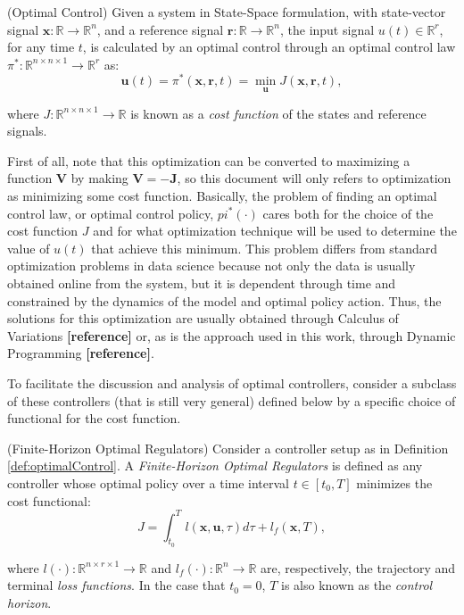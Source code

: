 \documentclass[a4paper,11pt]{book}
\numberwithin{figure}{chapter}
\numberwithin{equation}{chapter}
\numberwithin{table}{chapter}
\theoremstyle{definition}
\newtheorem{definition}{Definition}[chapter]
\newcounter{boxed-theorem}
\newcounter{boxed-definition}
\newenvironment{boxed-definition}[1]
{\begin{shaded} \begin{definition}{#1}}
{\end{definition} \end{shaded}}
\begin{document}
\begin{boxed-definition}{(Optimal Control)} \label{def:optimalControl}
Given a system in State-Space formulation, with state-vector signal $\bm{x} : \mathbb{R} \rightarrow \mathbb{R}^{n}$, and a reference signal $\bm{r} : \mathbb{R} \rightarrow \mathbb{R}^{n}$, the input signal $u(t) \in \mathbb{R}^r$, for any time $t$, is calculated by an optimal control through an optimal control law $\pi^* : \mathbb{R}^{n \times n \times 1} \rightarrow \mathbb{R}^r$ as:
    \begin{equation}
        \bm{u}(t) = \pi^*(\bm{x}, \bm{r}, t) = \min_{\bm{u}} J(\bm{x}, \bm{r}, t)
    ,\end{equation}
    
\noindent where $J : \mathbb{R}^{n \times n \times 1} \rightarrow \mathbb{R}$ is known as a \textit{cost function} of the states and reference signals.
\end{boxed-definition}

First of all, note that this optimization can be converted to maximizing a function $\bm{V}$ by making $\bm{V} = -\bm{J}$, so this document will only refers to optimization as minimizing some cost function. Basically, the problem of finding an optimal control law, or optimal control policy, $pi^*(\cdot)$ cares both for the choice of the cost function $J$ and for what optimization technique will be used to determine the value of $u(t)$ that achieve this minimum. This problem differs from standard optimization problems in data science because not only the data is usually obtained online from the system, but it is dependent through time and constrained by the dynamics of the model and optimal policy action. Thus, the solutions for this optimization are usually obtained through Calculus of Variations \textbf{[reference]} or, as is the approach used in this work, through Dynamic Programming \textbf{[reference]}.

To facilitate the discussion and analysis of optimal controllers, consider a subclass of these controllers (that is still very general) defined below by a specific choice of functional for the cost function.

\begin{boxed-definition}{(Finite-Horizon Optimal Regulators)} \label{def:finiteHorizonOC}
    Consider a controller setup as in Definition \ref{def:optimalControl}. A \textit{Finite-Horizon Optimal Regulators} is defined as any controller whose optimal policy over a time interval $t \in [t_0, T]$ minimizes the cost functional:
    \begin{equation}
        J = \int_{t_0}^T l(\bm{x}, \bm{u}, \tau) d \tau + l_f(\bm{x}, T)
    ,\end{equation}
    
    \noindent where $l(\cdot) : \mathbb{R}^{n \times r \times 1} \rightarrow \mathbb{R}$ and $l_f(\cdot) : \mathbb{R}^{n} \rightarrow \mathbb{R}$ are, respectively, the trajectory and terminal \textit{loss functions}. In the case that $t_0 = 0$, $T$ is also known as the \textit{control horizon}.
\end{boxed-definition}
\end{document}
